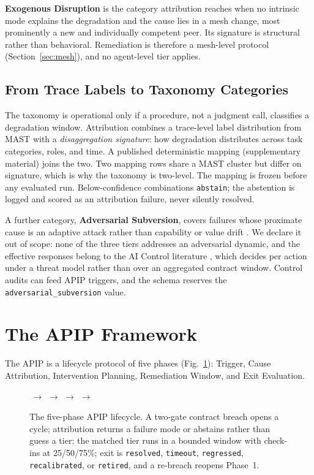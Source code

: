 \documentclass[conference]{IEEEtran}
\newcommand{\code}[1]{\texttt{\small #1}}
\begin{document}
\textbf{Exogenous Disruption} is the category attribution reaches when no
intrinsic mode explains the degradation and the cause lies in a mesh change,
most prominently a new and individually competent peer. Its signature is
structural rather than behavioral. Remediation is therefore a mesh-level
protocol (Section~\ref{sec:mesh}), and no agent-level tier applies.

\subsection{From Trace Labels to Taxonomy Categories}
\label{sec:mapping}

The taxonomy is operational only if a procedure, not a judgment call,
classifies a degradation window. Attribution combines a trace-level label
distribution from MAST \cite{cemri2025} with a \emph{disaggregation signature}:
how degradation distributes across task categories, roles, and time. A
published deterministic mapping (supplementary material) joins the two. Two
mapping rows share a MAST cluster but differ on signature, which is why the
taxonomy is two-level. The mapping is frozen before any evaluated run.
Below-confidence combinations \code{abstain}; the abstention is logged and
scored as an attribution failure, never silently resolved.

A further category, \textbf{Adversarial Subversion}, covers failures whose
proximate cause is an adaptive attack rather than capability or value drift
\cite{bhatt2025, schoen2025}. We declare it out of scope: none of the three
tiers addresses an adversarial dynamic, and the effective responses belong to
the AI Control literature \cite{greenblatt2023}, which decides per action under
a threat model rather than over an aggregated contract window. Control audits
can feed APIP triggers, and the schema reserves the
\code{adversarial\_subversion} value.

\section{The APIP Framework}
\label{sec:framework}

The APIP is a lifecycle protocol of five phases (Fig.~\ref{fig:lifecycle}):
Trigger, Cause Attribution, Intervention Planning, Remediation Window, and
Exit Evaluation.

\begin{figure}[t]
  \centering
  \scriptsize
  \setlength{\fboxsep}{2pt}
  \,$\rightarrow$\,\,$\rightarrow$\,\,$\rightarrow$\,\,$\rightarrow$\,
  \caption{The five-phase APIP lifecycle. A two-gate contract breach opens a
  cycle; attribution returns a failure mode or abstains rather than guess a
  tier; the matched tier runs in a bounded window with check-ins at 25/50/75\%;
  exit is \code{resolved}, \code{timeout}, \code{regressed},
  \code{recalibrated}, or \code{retired}, and a re-breach reopens Phase~1.}
  \label{fig:lifecycle}
\end{figure}
\end{document}
